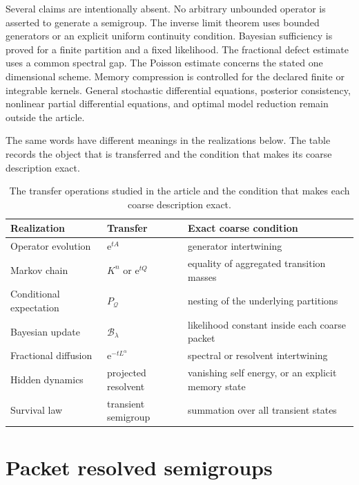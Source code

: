 \documentclass[11pt,a4paper]{article}
\theoremstyle{definition}
\theoremstyle{remark}
\newcommand{\Bcal}{\mathcal B}
\newcommand{\e}{\mathrm e}
\begin{document}
Several claims are intentionally absent. No arbitrary unbounded operator is asserted to generate a semigroup. The inverse limit theorem uses bounded generators or an explicit uniform continuity condition. Bayesian sufficiency is proved for a finite partition and a fixed likelihood. The fractional defect estimate uses a common spectral gap. The Poisson estimate concerns the stated one dimensional scheme. Memory compression is controlled for the declared finite or integrable kernels. General stochastic differential equations, posterior consistency, nonlinear partial differential equations, and optimal model reduction remain outside the article.

The same words have different meanings in the realizations below. The table records the object that is transferred and the condition that makes its coarse description exact.

\begin{table}[t]
\centering
\small
\begin{tabular}{>{\raggedright\arraybackslash}p{}>{\raggedright\arraybackslash}p{}>{\raggedright\arraybackslash}p{}}
\toprule
Realization & Transfer & Exact coarse condition \\
\midrule
Operator evolution & $\e^{tA}$ & generator intertwining \\
Markov chain & $K^n$ or $\e^{tQ}$ & equality of aggregated transition masses \\
Conditional expectation & $P_{\mathcal Q}$ & nesting of the underlying partitions \\
Bayesian update & $\Bcal_\lambda$ & likelihood constant inside each coarse packet \\
Fractional diffusion & $\e^{-tL^\alpha}$ & spectral or resolvent intertwining \\
Hidden dynamics & projected resolvent & vanishing self energy, or an explicit memory state \\
Survival law & transient semigroup & summation over all transient states \\
\bottomrule
\end{tabular}
\caption{The transfer operations studied in the article and the condition that makes each coarse description exact.}
\label{extended:tab:transfer_dictionary}
\end{table}

\section{Packet resolved semigroups}\label{extended:section:02}\label{extended:sec:packet_semigroups}
\end{document}
